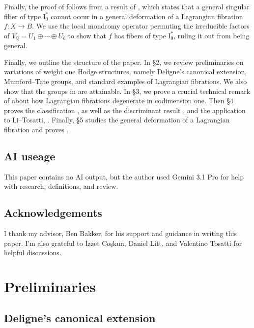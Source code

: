 \documentclass[12pt]{amsart}
\newcommand{\Q}{\mathbb{Q}}
\theoremstyle{definition}
\numberwithin{equation}{section}
\begin{document}
Finally, the proof of  follows from a result 
of \cite{lehn2016}, which states that a general singular fiber of type 
\(\mathrm{I}_0^*\) cannot occur in a general deformation of a Lagrangian fibration 
\(f: X \to B\). We use the local mondromy operator permuting the irreducible factors 
of \(V_\Q = U_1 \oplus \cdots \oplus U_k\) to show that \(f\) has fibers of type 
\(\mathrm{I}_0^*\), ruling it out from being general. 


Finally, we outline the structure of the paper. 
In \S2, we review preliminaries on variations of weight one Hodge structures, namely
Deligne's canonical extension, Mumford--Tate groups, and standard examples of Lagrangian 
fibrations. We also show that the groups in  are attainable. 
In \S3, we prove a crucial technical remark of \cite{bakker-schnell23} about how 
Lagrangian fibrations degenerate in codimension one. Then \S4 proves the classification 
, as well as the discriminant result
, and the application 
to Li--Tosatti, . Finally, \S5 studies the general 
deformation of a Lagrangian fibration and proves .

\subsection*{AI useage}
This paper contains no AI output, but the author used Gemini 3.1 Pro for help with 
research, definitions, and review.

\subsection*{Acknowledgements}
I thank my advisor, Ben Bakker, for his support and guidance in writing this paper.
I'm also grateful to \.{I}zzet Co\c{s}kun, Daniel Litt, and Valentino Tosatti for 
helpful discussions. 





\section{Preliminaries}







\subsection{Deligne's canonical extension}
\end{document}
